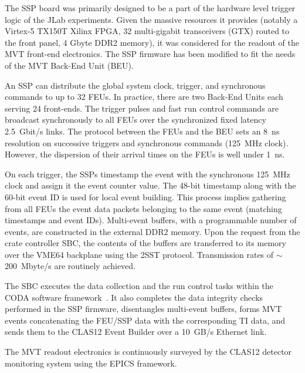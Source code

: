 The SSP board was primarily designed to be a part of the hardware level trigger logic of the JLab experiments. Given the
massive resources it provides (notably a Virtex-5 TX150T Xilinx FPGA, 32 multi-gigabit transceivers (GTX) routed to the
front panel, 4 Gbyte DDR2 memory), it was considered for the readout of the MVT front-end electronics. The SSP firmware
has been modified to fit the needs of the MVT Back-End Unit (BEU).

An SSP can distribute the global system clock, trigger, and synchronous commands to up to 32 FEUs. In practice, there are
two Back-End Units each serving 24 front-ends. The trigger pulses and fast run control commands are broadcast synchronously
to all FEUs over the synchronized fixed latency 2.5~Gbit/s links. The protocol between the FEUs and the BEU sets an 8~ns
resolution on successive triggers and synchronous commands (125~MHz clock). However, the dispersion of their arrival times
on the FEUs is well under 1~ns.

On each trigger, the SSPs timestamp the event with the synchronous 125~MHz clock and assign it the event counter value. The
48-bit timestamp along with the 60-bit event ID is used for local event building. This process implies gathering from all FEUs
the event data packets belonging to the same event (matching timestamps and event IDs). Multi-event buffers, with a
programmable number of events, are constructed in the external DDR2 memory. Upon the request from the crate controller
SBC, the contents of the buffers are transferred to its memory over the VME64 backplane using the 2SST protocol. Transmission
rates of $\sim$200~Mbyte/s are routinely achieved.

The SBC executes the data collection and the run control tasks within the CODA software framework~\cite{daq-nim}. It 
also
completes the data integrity checks performed in the SSP firmware, disentangles multi-event buffers, forms MVT events
concatenating the FEU/SSP data with the corresponding TI data, and sends them to the CLAS12 Event Builder over a 10~GB/s
Ethernet link.

The MVT readout electronics is continuously surveyed by the CLAS12 detector monitoring system using the EPICS framework.
